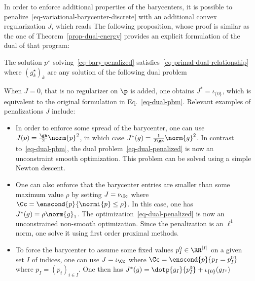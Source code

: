 In order to enforce additional properties of the barycenters, it is possible to penalize~\eqref{eq-variational-barycenter-discrete} with an additional convex regularization $J$, which reads
The following proposition, whose proof is similar as the one of Theorem~\ref{prop-dual-energy} provides an explicit formulation of the dual of that program:

\begin{proposition}
	The solution $p^\star$ solving~\eqref{eq-bary-penalized} satisfies~\eqref{eq-primal-dual-relationship} where $( g_k^\star )_k$ are any solution of the following dual problem
\end{proposition}

When $J=0$, that is no regularizer on $\p$ is added, one obtains $J^* = \iota_{\{0\}}$, which is equivalent to the original formulation in Eq.~\eqref{eq-dual-pbm}. Relevant examples of penalizations $J$ include:
\begin{itemize}
	\item In order to enforce some spread of the barycenter, one can use $J(p) = \frac{\ga}{2}\norm{p}^2$, in which case $J^*(g) = \frac{1}{2\ga}\norm{g}^2$. In contrast to~\eqref{eq-dual-pbm}, the dual problem~\eqref{eq-dual-penalized} is now an unconstraint smooth optimization. This problem can be solved using a simple Newton descent.  
	\item One can also enforce that the barycenter entries are smaller than some maximum value $\rho$ by setting $J = \iota_{\Cc}$ where $\Cc = \enscond{p}{\normi{p} \leq \rho}$. In this case, one has $J^*(g) = \rho \norm{g}_1$. The optimization~\eqref{eq-dual-penalized} is now an unconstrained non-smooth optimization. Since the penalization is an $\ell^1$ norm, one solve it using first order proximal methods. %
	\item To force the barycenter to assume some fixed values $p_I^0 \in \RR^{|I|}$ on a given set $I$ of indices, one can use $J=\iota_{\Cc}$ where $\Cc = \enscond{p}{p_I = p_I^0}$ where $p_I=(p_i)_{i \in I}$. One then has $J^*(g) = \dotp{g_I}{p_I^0} + \iota_{\{0\}}(g_{I^c})$ %
\end{itemize}